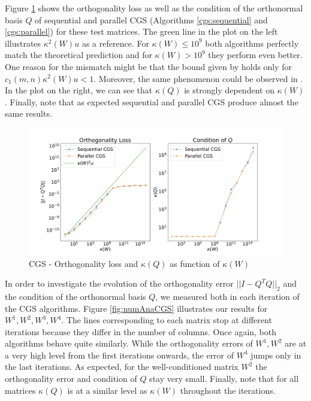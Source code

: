 \documentclass{article}
\begin{document}
Figure \ref{fig:orthoErrorCGS} shows the orthogonality loss as well as the
condition of the orthonormal basis $Q$ of sequential and parallel CGS
(Algorithms \ref{cgs:sequential} and \ref{cgs:parallel}) for these test
matrices. The green line in the plot on the left illustrates $\kappa^2(W) u$ as
a reference. For $\kappa(W) \leq 10^9$ both algorithms perfectly match the
theoretical prediction and for $\kappa(W) > 10^9$ they perform even better. One
reason for the mismatch might be that the bound given by \cite{Grigori:2023}
holds only for $c_1(m,n) \kappa^2(W) u < 1$. Moreover, the same phenomenon could
be observed in \cite{Swirydowicz:2020}. In the plot on the right, we can see
that $\kappa(Q)$ is strongly dependent on $\kappa(W)$. Finally, note that as
expected sequential and parallel CGS produce almost the same results.
\begin{figure}[t]
    \centering
    \caption{CGS - Orthogonality loss and $\kappa(Q)$ as function of $\kappa(W)$} \label{fig:orthoErrorCGS}
    \includegraphics[width=\textwidth, trim = 0cm 1cm 0cm 1cm]
        {./plots/CGS_Orthogonality_Error_complete.pdf}
\end{figure}

In order to investigate the evolution of the orthogonality error $||I - Q^T
Q||_2$ and the condition of the orthonormal basis $Q$, we measured both in each
iteration of the CGS algorithms. Figure \ref{fig:numAnaCGS} illustrates our
results for $W^1,W^2,W^3,W^4$. The lines corresponding to each matrix stop at
different iterations because they differ in the number of columns. Once again,
both algorithms behave quite similarly. While the orthogonality errors of $W^1,
W^2$ are at a very high level from the first iterations onwards, the error of
$W^4$ jumps only in the last iterations. As expected, for the well-conditioned
matrix $W^2$ the orthogonality error and condition of $Q$ stay very small.
Finally, note that for all matrices $\kappa(Q)$ is at a similar level as
$\kappa(W)$ throughout the iterations.
\end{document}
